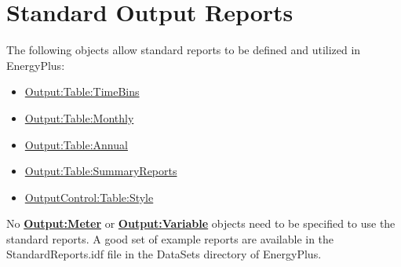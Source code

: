 \chapter{Standard Output Reports}\label{standard-output-reports}

The following objects allow standard reports to be defined and utilized in EnergyPlus:

\begin{itemize}
\item
  \hyperref[outputtabletimebins]{Output:Table:TimeBins}
\item
  \hyperref[outputtablemonthly]{Output:Table:Monthly}
\item
  \hyperref[outputtableannual]{Output:Table:Annual}
\item
  \hyperref[outputtablesummaryreports]{Output:Table:SummaryReports}
\item
  \hyperref[outputcontroltablestyle]{OutputControl:Table:Style}
\end{itemize}

No \textbf{\hyperref[outputmeter-and-outputmetermeterfileonly]{Output:Meter}} or \textbf{\hyperref[outputvariable]{Output:Variable}} objects need to be specified to use the standard reports. A good set of example reports are available in the StandardReports.idf file in the DataSets directory of EnergyPlus.









